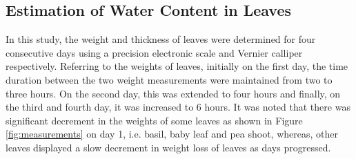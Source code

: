 \documentclass[journal,article,submit,moreauthors,pdftex]{Definitions/mdpi}
\renewcommand{\^}{\hat}  %
\begin{document}
\subsection{Estimation of Water Content in Leaves}
In this study, the weight and thickness of leaves were determined for four consecutive days using a precision electronic scale and Vernier calliper respectively. Referring to the weights of leaves, initially on the first day, the time duration between the two weight measurements were maintained from two to three hours. On the second day, this was extended to four hours and finally, on the third and fourth day, it was increased to 6 hours. It was noted that there was significant decrement in the weights of some leaves as shown in Figure \ref{fig:measurements} on day 1, i.e. basil, baby leaf and pea shoot, whereas, other leaves displayed a slow decrement in weight loss of leaves as days progressed.
\end{document}
